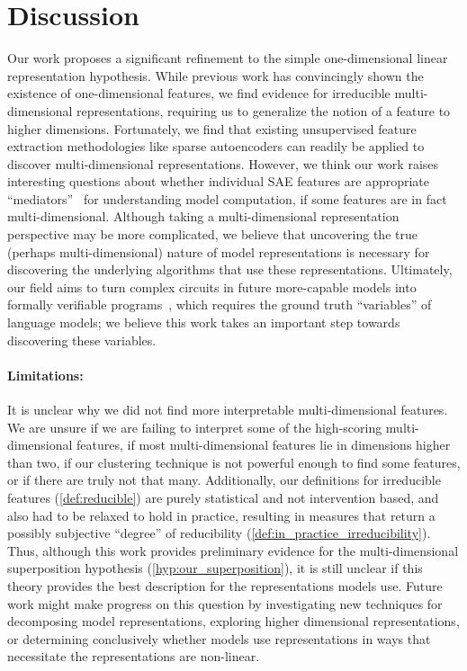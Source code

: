 \documentclass{article} %
\DeclareRobustCommand{\revOne}[1]{#1}
\DeclareRobustCommand{\revFour}[1]{#1}
\theoremstyle{plain}
\theoremstyle{definition}
\begin{document}
\section{Discussion}
\label{sec:Discussion}
Our work proposes a significant refinement to the simple one-dimensional linear representation hypothesis. While previous work has convincingly shown the existence of one-dimensional features, we find evidence for irreducible multi-dimensional representations, requiring us to generalize the notion of a feature to higher dimensions. Fortunately, we find that existing unsupervised feature extraction methodologies like sparse autoencoders can readily be applied to discover multi-dimensional representations. However, we think our work raises interesting questions about whether individual SAE features are appropriate ``mediators''~\citep{mueller2024quest} for understanding model computation, if some features are in fact multi-dimensional. Although taking a multi-dimensional representation perspective may be more complicated, we believe that uncovering the true (perhaps multi-dimensional) nature of model representations is necessary for discovering the underlying algorithms that use these representations. Ultimately, our field aims to turn complex circuits in future more-capable models into formally verifiable programs~\citep{manifesto_one, manifesto_two}, which requires the ground truth ``variables'' of language models; we believe this work takes an important step towards discovering these variables. 

\paragraph{Limitations:} 
\revOne{It is unclear why we did not find more interpretable multi-dimensional features. We are unsure if we are failing to interpret some of the high-scoring multi-dimensional features,} \revFour{if most multi-dimensional features lie in dimensions higher than two,} \revOne{ if our clustering technique is not powerful enough to find some features, or if there are truly not that many. Additionally, our definitions for irreducible features (\cref{def:reducible}) are purely statistical and not intervention based, and also had to be relaxed to hold in practice, resulting in measures that return a possibly subjective ``degree'' of reducibility (\cref{def:in_practice_irreducibility}). Thus, although this work provides preliminary evidence for the multi-dimensional superposition hypothesis (\cref{hyp:our_superposition}), it is still unclear if this theory provides the best description for the representations models use. Future work might make progress on this question by investigating new techniques for decomposing model representations, exploring higher dimensional representations, or determining conclusively whether models use representations in ways that necessitate the representations are non-linear.}
\end{document}
